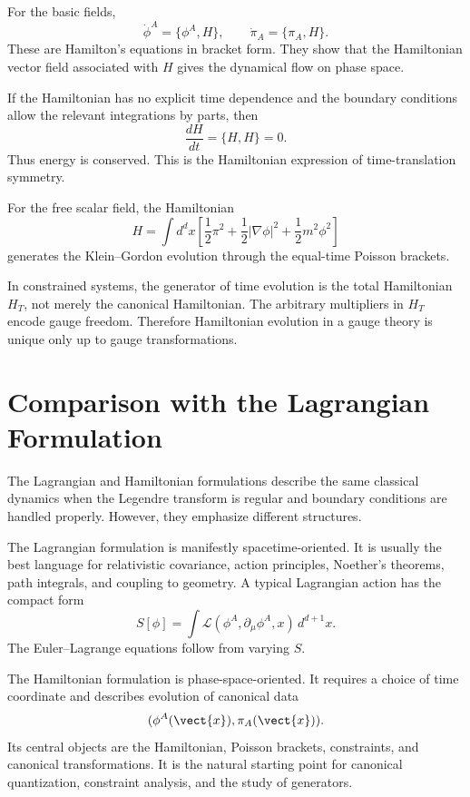 For the basic fields,
\[
    \dot\phi^A=\{\phi^A,H\},
    \qquad
    \dot\pi_A=\{\pi_A,H\}.
\]
These are Hamilton's equations in bracket form. They show that the Hamiltonian
vector field associated with \(H\) gives the dynamical flow on phase space.

If the Hamiltonian has no explicit time dependence and the boundary conditions
allow the relevant integrations by parts, then
\[
    \frac{dH}{dt}=\{H,H\}=0.
\]
Thus energy is conserved. This is the Hamiltonian expression of time-translation
symmetry.

\begin{examplebox}
For the free scalar field, the Hamiltonian
\[
    H=\int d^d x\left[
        \frac{1}{2}\pi^2
        +\frac{1}{2}|\nabla\phi|^2
        +\frac{1}{2}m^2\phi^2
    \right]
\]
generates the Klein--Gordon evolution through the equal-time Poisson brackets.
\end{examplebox}

In constrained systems, the generator of time evolution is the total Hamiltonian
\(H_T\), not merely the canonical Hamiltonian. The arbitrary multipliers in
\(H_T\) encode gauge freedom. Therefore Hamiltonian evolution in a gauge theory
is unique only up to gauge transformations.

\section{Comparison with the Lagrangian Formulation}

The Lagrangian and Hamiltonian formulations describe the same classical dynamics
when the Legendre transform is regular and boundary conditions are handled
properly. However, they emphasize different structures.

The Lagrangian formulation is manifestly spacetime-oriented. It is usually the
best language for relativistic covariance, action principles, Noether's
theorems, path integrals, and coupling to geometry. A typical Lagrangian action
has the compact form
\[
    S[\phi]=\int \mathcal{L}(\phi^A,\partial_\mu\phi^A,x)\,d^{d+1}x.
\]
The Euler--Lagrange equations follow from varying \(S\).

The Hamiltonian formulation is phase-space-oriented. It requires a choice of
time coordinate and describes evolution of canonical data
\[
    (\phi^A(\vect{x}),\pi_A(\vect{x})).
\]
Its central objects are the Hamiltonian, Poisson brackets, constraints, and
canonical transformations. It is the natural starting point for canonical
quantization, constraint analysis, and the study of generators.


